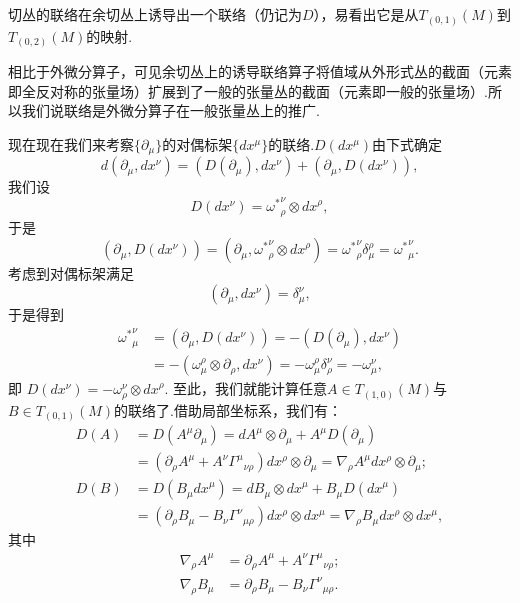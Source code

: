 \documentclass[10pt]{article}
\begin{document}
	切丛的联络在余切丛上诱导出一个联络（仍记为$D$），易看出它是从$T_{(0,1)}(M)$到$T_{(0,2)}(M)$的映射.
	\begin{remark}
		相比于外微分算子，可见余切丛上的诱导联络算子将值域从外形式丛的截面（元素即全反对称的张量场）扩展到了一般的张量丛的截面（元素即一般的张量场）.所以我们说联络是外微分算子在一般张量丛上的推广.
	\end{remark}
	现在现在我们来考察$\{\partial_\mu\}$的对偶标架$\{dx^\mu\}$的联络.$D(dx^\mu)$由下式确定
	$$d\left(\partial_\mu,dx^\nu\right)=\left(D(\partial_\mu),dx^\nu\right)+\left(\partial_\mu,D(dx^\nu)\right),$$
	我们设
	$$D(dx^\nu)={\omega^*}^\nu_\rho\otimes{dx}^\rho,$$
	于是
	$$\left(\partial_\mu,D(dx^\nu)\right)=\left(\partial_\mu,{\omega^*}^\nu_\rho\otimes{dx}^\rho\right)={\omega^*}^\nu_\rho\delta^\rho_\mu={\omega^*}^\nu_\mu.$$
	考虑到对偶标架满足
	$$\left(\partial_\mu,dx^\nu\right)=\delta^\nu_\mu,$$ 
	于是得到								 
	\begin{equation}
		\begin{split}
			{\omega^*}^\nu_\mu&=\left(\partial_\mu,D(dx^\nu)\right)=-\left(D(\partial_\mu),dx^\nu\right)\\
			&=-\left(\omega^\rho_\mu\otimes\partial_\rho,dx^\nu\right)=-{\omega}^\rho_\mu\delta^\nu_\rho=-{\omega}^\nu_\mu,
		\end{split}
	\end{equation}								 
	即
	$D(dx^\nu)=-{\omega}^\nu_\rho\otimes{dx}^\rho$.
	至此，我们就能计算任意$A\in T_{(1,0)}(M)$与$B\in T_{(0,1)}(M)$的联络了.借助局部坐标系，我们有：								 
	\begin{equation}
		\begin{split}
			D(A)&=D(A^\mu\partial_\mu)=dA^\mu\otimes\partial_\mu+A^{\mu}D(\partial_\mu)\\
			&=(\partial_{\rho}A^\mu+A^{\nu}{\Gamma^\mu}_{\nu\rho})dx^\rho{\otimes}\partial_\mu=\nabla_{\rho}A^{\mu}dx^\rho{\otimes}\partial_\mu;\\
			D(B)&=D(B_{\mu}{dx}^\mu)=dB_\mu\otimes{dx}^\mu+B_{\mu}D({dx}^\mu)\\
			&=(\partial_{\rho}B_\mu-B_\nu{\Gamma^\nu}_{\mu\rho})dx^\rho{\otimes}dx^\mu=\nabla_{\rho}B_{\mu}dx^\rho{\otimes}dx^\mu,
		\end{split}	
	\end{equation}
	其中									 
	\begin{equation}
		\begin{split}
			\nabla_{\rho}A^\mu&=\partial_{\rho}A^\mu+A^{\nu}{\Gamma^\mu}_{\nu\rho};\\
			\nabla_{\rho}B_{\mu}&=\partial_{\rho}B_\mu-B_\nu{\Gamma^\nu}_{\mu\rho}.
		\end{split}		
	\end{equation}								
\end{document}
